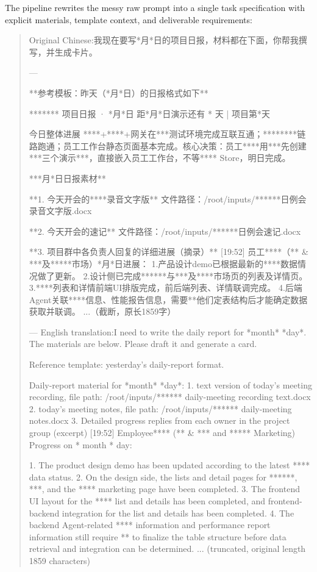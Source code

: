 \documentclass[11pt, a4paper, copyright, frontis]{frontis}
\newenvironment{casebox}{%
  \begin{quote}%
  \setlength{\parindent}{0pt}%
  \setlength{\parskip}{0pt}%
}{%
  \end{quote}%
}
\newenvironment{caselines}{%
  \begingroup
  \parindent0pt
  \parskip0pt
  \obeylines
  \obeyspaces
}{%
  \endgroup
}
\begin{document}
The pipeline rewrites the messy raw prompt into a single task specification with explicit materials, template context, and deliverable requirements:

\begin{casebox}\scriptsize\raggedright
\begin{caselines}
Original Chinese:\nopagebreak[4]
我现在要写*月*日的项目日报，材料都在下面，你帮我撰写，并生成卡片。

---

**参考模板：昨天（*月*日）的日报格式如下**

 ******* 项目日报 · *月*日
距*月*日演示还有 * 天 | 项目第*天

今日整体进展
****+****+网关在***测试环境完成互联互通；********链路跑通；员工工作台静态页面基本完成。核心决策：员工****用***先创建***三个演示***，直接嵌入员工工作台，不等**** Store，明日完成。

***月*日日报素材**

**1. 今天开会的****录音文字版**
文件路径：/root/inputs/******日例会录音文字版.docx

**2. 今天开会的速记**
文件路径：/root/inputs/******日例会速记.docx

**3. 项目群中各负责人回复的详细进展（摘录）**
[19:52] 员工****（** \& ***及*****市场）*月*日进展：
1.产品设计demo已根据最新的****数据情况做了更新。
2.设计侧已完成******与***及****市场页的列表及详情页。
3.****列表和详情前端UI排版完成，前后端列表、详情联调完成。
4.后端Agent关联****信息、性能报告信息，需要**他们定表结构后才能确定数据获取并联调。
...（截断，原长1859字）

---
English translation:\nopagebreak[4]
I need to write the daily report for *month* *day*. The materials are below. Please draft it and generate a card.

Reference template: yesterday's daily-report format.

Daily-report material for *month* *day*:
1. text version of today's meeting recording, file path: /root/inputs/****** daily-meeting recording text.docx
2. today's meeting notes, file path: /root/inputs/****** daily-meeting notes.docx
3. Detailed progress replies from each owner in the project group (excerpt)
[19:52] Employee**** (** \& *** and ***** Marketing) Progress on * month * day:

1. The product design demo has been updated according to the latest **** data status.
2. On the design side, the lists and detail pages for ******, ***, and the **** marketing page have been completed.
3. The frontend UI layout for the **** list and details has been completed, and frontend-backend integration for the list and details has been completed.
4. The backend Agent-related **** information and performance report information still require ** to finalize the table structure before data retrieval and integration can be determined.
   ... (truncated, original length 1859 characters)
\end{caselines}
\end{casebox}
\end{document}
